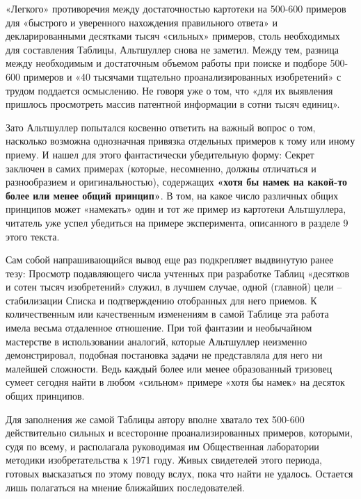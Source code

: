 \documentclass[11pt,a4paper]{article}
\begin{document}
«Легкого» противоречия между достаточностью картотеки на 500-600 примеров для
«быстрого и уверенного нахождения правильного ответа» и декларированными
десятками тысяч «сильных» примеров, столь необходимых для составления Таблицы,
Альтшуллер снова не заметил. Между тем, разница между необходимым и
достаточным объемом работы при поиске и подборе 500-600 примеров и «40
тысячами тщательно проанализированных изобретений» с трудом поддается
осмыслению. Не говоря уже о том, что «для их выявления пришлось просмотреть
массив патентной информации в сотни тысяч единиц».
\cite[стр. 83]{Altshuller1979}

Зато Альтшуллер попытался косвенно ответить на важный вопрос о том, насколько
возможна однозначная привязка отдельных примеров к тому или иному приему. И
нашел для этого фантастически убедительную форму: Секрет заключен в самих
примерах (которые, несомненно, должны отличаться и разнообразием и
оригинальностью), содержащих \textbf{«хотя бы намек на какой-то более или
  менее общий принцип»}. В том, на какое число различных общих принципов может
«намекать» один и тот же пример из картотеки Альтшуллера, читатель уже успел
убедиться на примере эксперимента, описанного в разделе 9 этого текста.

Сам собой напрашивающийся вывод еще раз подкрепляет выдвинутую ранее тезу:
Просмотр подавляющего числа учтенных при разработке Таблиц «десятков и сотен
тысяч изобретений» служил, в лучшем случае, одной (главной) цели --
стабилизации Списка и подтверждению отобранных для него приемов. К
количественным или качественным изменениям в самой Таблице эта работа имела
весьма отдаленное отношение. При той фантазии и необычайном мастерстве в
использовании аналогий, которые Альтшуллер неизменно демонстрировал, подобная
постановка задачи не представляла для него ни малейшей сложности. Ведь каждый
более или менее образованный тризовец сумеет сегодня найти в любом «сильном»
примере «хотя бы намек» на десяток общих принципов.

Для заполнения же самой Таблицы автору вполне хватало тех 500-600
действительно сильных и всесторонне проанализированных примеров, которыми,
судя по всему, и располагала руководимая им Общественная лаборатории методики
изобретательства к 1971 году. Живых свидетелей этого периода, готовых
высказаться по этому поводу вслух, пока что найти не удалось. Остается лишь
полагаться на мнение ближайших последователей.
\end{document}

